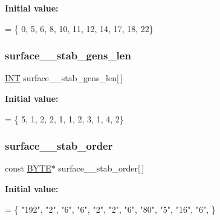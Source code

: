 {\bfseries Initial value\+:}
\begin{DoxyCode}
= \{ 0, 5, 6, 8, 10, 11, 12, 14, 17, 18, 
    22\}
\end{DoxyCode}
\mbox{\label{surface__32_8_c_a01219e73149aad76bf9de454a0f4a4a0}} 
\subsubsection{\texorpdfstring{surface\+\_\+\_\+stab\+\_\+gens\+\_\+len}{surface\_32\_stab\_gens\_len}}
{\footnotesize\ttfamily \mbox{\hyperlink{galois_8h_a09fddde158a3a20bd2dcadb609de11dc}{I\+NT}} surface\+\_\+\_\+stab\+\_\+gens\+\_\+len\mbox{[}$\,$\mbox{]}}

{\bfseries Initial value\+:}
\begin{DoxyCode}
= \{ 5, 1, 2, 2, 1, 1, 2, 3, 1, 4, 
    2\}
\end{DoxyCode}
\mbox{\label{surface__32_8_c_ac851d57991b1816da1c53ac86064a626}} 
\subsubsection{\texorpdfstring{surface\+\_\+\_\+stab\+\_\+order}{surface\_32\_stab\_order}}
{\footnotesize\ttfamily const \mbox{\hyperlink{galois_8h_ab6cc7b4aeb6ea31aba2b3fbfc83ff5e6}{B\+Y\+TE}}$\ast$ surface\+\_\+\_\+stab\+\_\+order\mbox{[}$\,$\mbox{]}}

{\bfseries Initial value\+:}
\begin{DoxyCode}
= \{
    \textcolor{stringliteral}{"192"},
    \textcolor{stringliteral}{"2"},
    \textcolor{stringliteral}{"6"},
    \textcolor{stringliteral}{"6"},
    \textcolor{stringliteral}{"2"},
    \textcolor{stringliteral}{"2"},
    \textcolor{stringliteral}{"6"},
    \textcolor{stringliteral}{"80"},
    \textcolor{stringliteral}{"5"},
    \textcolor{stringliteral}{"16"},
    \textcolor{stringliteral}{"6"},
\}
\end{DoxyCode}
